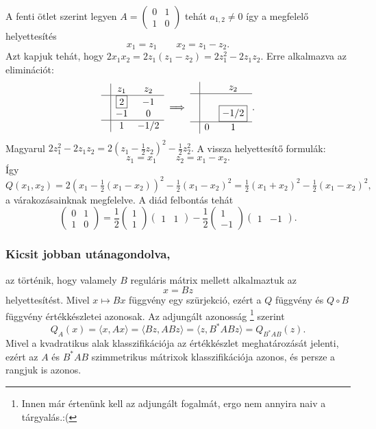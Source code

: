 \documentclass[a4paper, showtrims]{memoir}
\theoremstyle{plain}
\theoremstyle{remark}
\theoremstyle{definition}
\newcommand{\ip}[2]{\langle#1,#2\rangle}
\begin{document}
A fenti ötlet szerint legyen 
$
A=
\begin{pmatrix}
    0&1\\1&0
\end{pmatrix}
$
tehát $a_{1,2}\neq 0$ így a megfelelő helyettesítés
\[
    x_1=z_1\qquad x_2=z_1-z_2.
\]
Azt kapjuk tehát, hogy 
\(
2x_1x_2=2z_1\left( z_1-z_2 \right)=2z_1^2-2z_1z_2.
\)
Erre alkalmazva az eliminációt:
\[
\begin{array}{c|cc}
     & z_1       & z_2\\
     \hline
     & \boxed{2} & -1 \\
     & -1         & 0 \\
    \hline
    & 1     & -1/2  
\end{array}
\implies
\begin{array}{c|cc}
     &  & z_2   \\
     \hline
     & &               \\
     & & \boxed{-1/2}   \\
     \hline
     &0 & 1 
\end{array}.
\]
Magyarul 
\(
2z_1^2-2z_1z_2=2\left( z_1-\frac{1}{2}z_2 \right)^2-\frac{1}{2}z_2^2.
\)
A vissza helyettesítő formulák:
\[
    z_1=x_1\qquad z_2=x_1-x_2.
\]
Így
\(
Q\left( x_1,x_2 \right)=
2\left( x_1-\frac{1}{2}\left( x_1-x_2 \right) \right)^2-\frac{1}{2}\left( x_1-x_2 \right)^2
=
\frac{1}{2}\left( x_1+x_2 \right)^2-\frac{1}{2}\left( x_1-x_2 \right)^2,
\)
a várakozásainknak megfelelve.
A diád felbontás tehát
\[
    \begin{pmatrix}
        0&1\\1&0
    \end{pmatrix}
    =\frac{1}{2}
    \begin{pmatrix}
        1\\1
    \end{pmatrix}
    \begin{pmatrix}
        1&1
    \end{pmatrix}
    -
    \frac{1}{2}
    \begin{pmatrix}
        1\\-1
    \end{pmatrix}
    \begin{pmatrix}
        1&-1
    \end{pmatrix}.
\]

\subsubsection{Kicsit jobban utánagondolva,}
az történik, hogy valamely $B$ reguláris mátrix mellett alkalmaztuk az 
\[
    x=Bz
\]
helyettesítést. 
Mivel $x\mapsto Bx$ függvény egy szürjekció, ezért a $Q$ függvény és $Q\circ B$ függvény értékkészletei azonosak.
Az adjungált azonosság%
\footnote{Innen már értenünk kell az adjungált fogalmát, ergo nem annyira naiv a tárgyalás.:(}
szerint
\[
    Q_A\left( x \right)
    =
    \ip{x}{Ax}
    =
    \ip{Bz}{ABz}
    =
    \ip{z}{B^\ast ABz}
    =Q_{B^\ast AB}\left( z \right).
\]
Mivel a kvadratikus alak klasszifikációja az értékkészlet meghatározását jelenti,
ezért az $A$ és $B^\ast AB$ szimmetrikus mátrixok klasszifikációja azonos, és persze a rangjuk is azonos.
\end{document}
